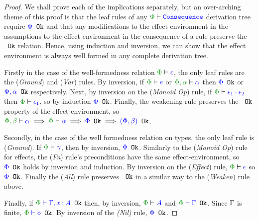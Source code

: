 \documentclass{Report}
\begin{document}
\begin{proof}
    We shall prove each of the implications separately, but an over-arching theme of this proof is that the leaf rules of any $\wellformed{\P}{\texttt{Consequence}}$ derivation tree require ${\color{blue} \Phi} \texttt{ Ok}$ and that any modifications to the effect environment in the assumptions to the effect environment in the consequence of a rule preserve the ${\color{blue} } \texttt{ Ok}$ relation. Hence, using induction and inversion, we can show that the effect environment is always well formed in any complete derivation tree.

    Firstly in the case of the well-formedness relation $\wellformed{\P}{\e}$, the only leaf rules are the (\textit{Ground}) and (\textit{Var}) rules. By inversion, if $\wellformed{\P}{e}$ or $\wellformed{\P, \a}{\a}$ then ${\color{blue} \Phi} \texttt{ Ok}$ or ${\color{blue} \Phi, \alpha} \texttt{ Ok}$ respectively. Next, by inversion on the (\textit{Monoid Op}) rule, if $\wellformed{\P}{\e_1\dot\e_2}$ then $\wellformed{\P}{\e_1}$, so by induction ${\color{blue} \Phi} \texttt{ Ok}$. Finally, the weakening rule preserves the ${\color{blue} } \texttt{ Ok}$ property of the effect environment, so $\wellformed{\P, \b}{\a} \implies \wellformed{\P}{\a} \implies \ok{\P} \implies \ok{(\P, \b)}$.

    Secondly, in the case of the well formedness relation on types, the only leaf rule is (\textit{Ground}). If $\wellformed{\P}{\g}$, then by inversion, ${\color{blue} \Phi} \texttt{ Ok}$. Similarly to the (\textit{Monoid Op}) rule for effects, the (\textit{Fn}) rule's preconditions have the same effect-environment, so ${\color{blue} \Phi} \texttt{ Ok}$ holds by inversion and induction. By inversion on the (\textit{Effect}) rule, $\wellformed{\P}{\e}$ so ${\color{blue} \Phi} \texttt{ Ok}$. Finally the (\textit{All}) rule preserves ${\color{blue} } \texttt{ Ok}$ in a similar way to the (\textit{Weaken}) rule above.

    Finally, if $\oke{\P}{\gax}$ then, by inversion, $\wellformed{\P}{A}$  and $\oke{\P}{\G}$. Since $\Gamma$ is finite, $\oke{\P}{\nil}$. By inversion of the \textit{(Nil)} rule, ${\color{blue} \Phi} \texttt{ Ok}$.
\end{proof}
\end{document}

